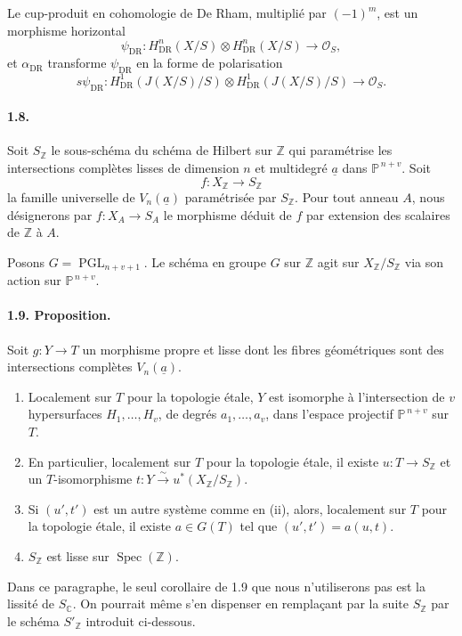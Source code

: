 \documentclass[10pt]{article}
\newcommand{\C}{\mathbb C}
\newcommand{\Pj}{\mathbb P}
\newcommand{\Z}{\mathbb Z}
\newcommand{\DR}{\mathrm{DR}}
\newcommand{\Spec}{\operatorname{Spec}}
\newcommand{\PGL}{\operatorname{PGL}}
\newcommand{\iso}{\xrightarrow{\sim}}
\begin{document}
Le cup-produit en cohomologie de De Rham, multiplié par \((-1)^m\), est un morphisme horizontal
\[
\tag{1.7.2}
\psi_{\DR}:H^n_{\DR}(X/S)\otimes H^n_{\DR}(X/S)\longrightarrow\mathcal O_S,
\]
et \(\alpha_{\DR}\) transforme \(\psi_{\DR}\) en la forme de polarisation
\[
\tag{1.7.3}
s\psi_{\DR}:H^1_{\DR}(J(X/S)/S)\otimes H^1_{\DR}(J(X/S)/S)\longrightarrow\mathcal O_S.
\]

\paragraph{1.8.} Soit \(S_\Z\) le sous-schéma du schéma de Hilbert sur \(\Z\) qui paramétrise les intersections complètes lisses de dimension \(n\) et multidegré \(\underline a\) dans \(\Pj^{\,n+v}\). Soit
\[
f:X_\Z\longrightarrow S_\Z
\]
la famille universelle de \(V_n(\underline a)\) paramétrisée par \(S_\Z\). Pour tout anneau \(A\), nous désignerons par \(f:X_A\to S_A\) le morphisme déduit de \(f\) par extension des scalaires de \(\Z\) à \(A\).

Posons \(G=\PGL_{n+v+1}\). Le schéma en groupe \(G\) sur \(\Z\) agit sur \(X_\Z/S_\Z\) via son action sur \(\Pj^{\,n+v}\).

\paragraph{1.9. Proposition.} Soit \(g:Y\to T\) un morphisme propre et lisse dont les fibres géométriques sont des intersections complètes \(V_n(\underline a)\).
\begin{enumerate}[label=(\roman*)]
\item Localement sur \(T\) pour la topologie étale, \(Y\) est isomorphe à l'intersection de \(v\) hypersurfaces \(H_1,\ldots,H_v\), de degrés \(a_1,\ldots,a_v\), dans l'espace projectif \(\Pj^{\,n+v}\) sur \(T\).
\item En particulier, localement sur \(T\) pour la topologie étale, il existe \(u:T\to S_\Z\) et un \(T\)-isomorphisme \(t:Y\iso u^*(X_\Z/S_\Z)\).
\item Si \((u',t')\) est un autre système comme en (ii), alors, localement sur \(T\) pour la topologie étale, il existe \(a\in G(T)\) tel que \((u',t')=a(u,t)\).
\item \(S_\Z\) est lisse sur \(\Spec(\Z)\).
\end{enumerate}

Dans ce paragraphe, le seul corollaire de 1.9 que nous n'utiliserons pas est la lissité de \(S_\C\). On pourrait même s'en dispenser en remplaçant par la suite \(S_\Z\) par le schéma \(S'_\Z\) introduit ci-dessous.
\end{document}
